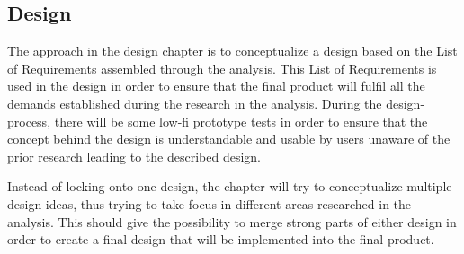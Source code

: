\subsection{Design}
The approach in the design chapter is to conceptualize a design based on the List of Requirements assembled through the analysis. This List of Requirements is used in the design in order to ensure that the final product will fulfil all the demands established during the research in the analysis. During the design-process, there will be some low-fi prototype tests in order to ensure that the concept behind the design is understandable and usable by users unaware of the prior research leading to the described design.
 
Instead of locking onto one design, the chapter will try to conceptualize multiple design ideas, thus trying to take focus in different areas researched in the analysis. This should give the possibility to merge strong parts of either design in order to create a final design that will be implemented into the final product.
